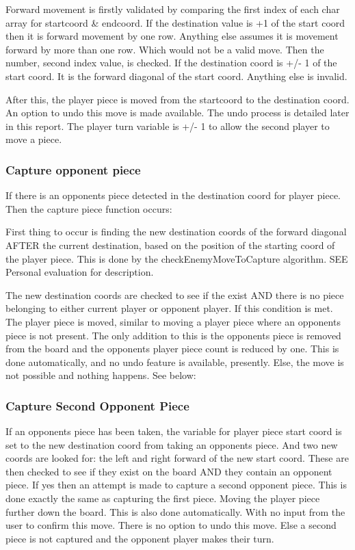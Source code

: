 \documentclass[10pt, a4paper]{article}
\begin{document}
    Forward movement is firstly validated by comparing the first index of each char array for startcoord \& endcoord. If the destination value is +1 of the start coord then it is forward movement by one row. Anything else assumes it is movement forward by more than one row. Which would not be a valid move. Then the number, second index value, is checked. If the destination coord is +/- 1 of the start coord. It is the forward diagonal of the start coord. Anything else is invalid.
    
    After this, the player piece is moved from the startcoord to the destination coord. An option to undo this move is made available. The undo process is detailed later in this report. The player turn variable is +/- 1 to allow the second player to move a piece.
    \subsubsection{Capture opponent piece}
    If there is an opponents piece detected in the destination coord for player piece. Then the capture piece function occurs:
    
    First thing to occur is finding the new destination coords of the forward diagonal AFTER the current destination, based on the position of the starting coord of the player piece. This is done by the checkEnemyMoveToCapture algorithm. SEE Personal evaluation for description.
    
    The new destination coords are checked to see if the exist AND there is no piece belonging to  either current player or opponent player. If this condition is met. The player piece is moved, similar to moving a player piece where an opponents piece is not present. The only addition to this is the opponents piece is removed from the board and the opponents player piece count is reduced by one. This is done automatically, and no undo feature is available, presently.
    Else, the move is not possible and nothing happens. See below:    
    \subsubsection{Capture Second Opponent Piece}
    If an opponents piece has been taken, the variable for player piece start coord is set to the new destination coord from taking an opponents piece. And two new coords are looked for: the left and right forward of the new start coord. These are then checked to see if they exist on the board AND they contain an opponent piece. If yes then an attempt is made to capture a second opponent piece. This is done exactly the same as capturing the first piece. Moving the player piece further down the board. This is also done automatically. With no input from the user to confirm this move. There is no option to undo this move.
    Else a second piece is not captured and the opponent player makes their turn.
\end{document}
